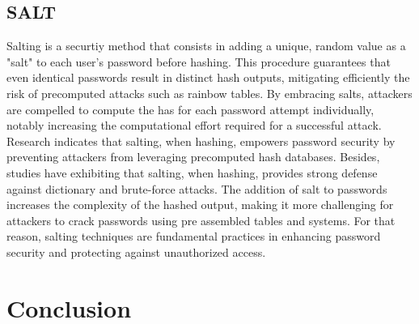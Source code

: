 \documentclass{comjnl}
\begin{document}
\subsection{SALT}
Salting is a securtiy method that consists in adding a unique, random value as a "salt" to each user's password before hashing. This procedure guarantees that even identical passwords result in distinct hash outputs, mitigating efficiently the risk of precomputed attacks such as rainbow tables. By embracing salts, attackers are compelled to compute the has for each password attempt individually, notably increasing the computational effort required for a successful attack. Research indicates that salting, when hashing, empowers password security by preventing attackers from leveraging precomputed hash databases. \cite{salting_description} Besides, studies have exhibiting that salting, when hashing, provides strong defense against dictionary and brute-force attacks. The addition of salt to passwords increases the complexity of the hashed output, making it more challenging for attackers to crack passwords using pre assembled tables and systems. \cite{salting_algo} For that reason, salting techniques are fundamental practices in enhancing password security and protecting against unauthorized access.

\section{Conclusion}
\end{document}
